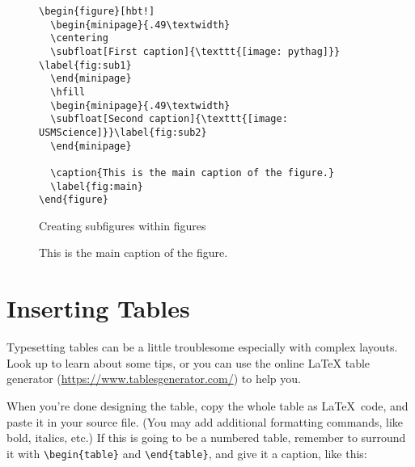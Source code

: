 \begin{figure}[hbt!]
\begin{lstlisting}
\begin{figure}[hbt!]
  \begin{minipage}{.49\textwidth}
  \centering
  \subfloat[First caption]{\texttt{[image: pythag]}} \label{fig:sub1}
  \end{minipage}
  \hfill
  \begin{minipage}{.49\textwidth}
  \subfloat[Second caption]{\texttt{[image: USMScience]}}\label{fig:sub2}
  \end{minipage}
  
  \caption{This is the main caption of the figure.}
  \label{fig:main}
\end{figure}
\end{lstlisting}
\caption{Creating subfigures within figures}
\end{figure}

\begin{figure}[hbt!]
  \begin{minipage}{.49\textwidth}
  \centering
   \label{fig:sub1}
  \end{minipage}
  \hfill
  \begin{minipage}{.49\textwidth}
  \label{fig:sub2}
  \end{minipage}
  
  \caption{This is the main caption of the figure.}
  \label{fig:main}
\end{figure}

\section{Inserting Tables}

Typesetting tables can be a little troublesome especially with complex layouts.  Look up \citep{roberts} to learn about some tips, or you can use the online \LaTeX{} table generator (\url{https://www.tablesgenerator.com/}) to help you.

When you're done designing the table, copy the whole table as \LaTeX\ code, and paste it in your source file.  (You may add additional formatting commands, like bold, italics, etc.)  If this is going to be a numbered table, remember to surround it with \verb|\begin{table}| and \verb|\end{table}|, and give it a caption, like this:

